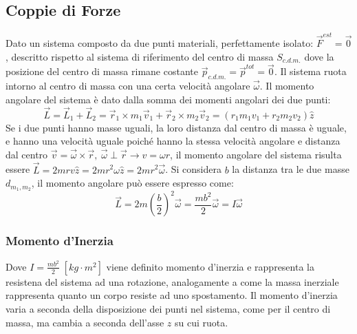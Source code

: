 \documentclass{article}
\numberwithin{equation}{subsection}
\begin{document}
\subsection{Coppie di Forze}

Dato un sistema composto da due punti materiali, perfettamente 
isolato: $\vec{F}^{est}=\vec{0}$, descritto rispetto al sistema di riferimento del centro di massa $S_{c.d.m.}$ 
dove la posizione del centro 
di massa rimane costante $\vec{p}_{c.d.m.}=\vec{p}^{tot}=\vec{0}$. 
Il sistema ruota intorno al centro di massa con una certa 
velocità angolare $\vec{\omega}$. Il momento angolare del sistema 
è dato dalla somma dei momenti angolari dei due punti: 
\begin{equation*}
    \vec{L}=\vec{L}_1+\vec{L}_2=\vec{r}_1\times m_1\vec{v}_1+\vec{r}_2\times m_2\vec{v}_2=(r_1m_1v_1+r_2m_2v_2)\hat{z}
\end{equation*}
Se i due punti hanno masse uguali, la loro distanza dal centro di 
massa è uguale, e hanno una velocità uguale poiché hanno la stessa 
velocità angolare e distanza dal centro $\vec{v}=\vec{\omega}\times\vec{r},\:\vec{\omega}\perp\vec{r}\rightarrow v=\omega r$, 
il momento angolare del sistema risulta essere $\vec{L}=2mrv\hat{z}=2mr^2\omega\hat{z}=2mr^2\vec{\omega}$. 
Si considera $b$ la distanza tra le due masse $d_{m_1,m_2}$, 
il momento angolare può essere espresso come:
\begin{equation}
    \vec{L}=\displaystyle 2m\left(\frac{b}{2}\right)^2\vec{\omega}=\frac{mb^2}{2}\vec{\omega}=I\vec{\omega}
\end{equation}

\subsubsection{Momento d'Inerzia}

Dove $I=\displaystyle\frac{mb^2}{2}\;\left[kg\cdot m^2\right]$ viene definito momento d'inerzia 
e rappresenta la resistena del sistema ad una rotazione, analogamente a come  
la massa inerziale rappresenta quanto un corpo resiste ad uno spostamento. Il momento d'inerzia varia a seconda della disposizione dei punti nel sistema, come per il centro 
di massa, ma cambia a seconda dell'asse $z$ su cui ruota. 
\end{document}
